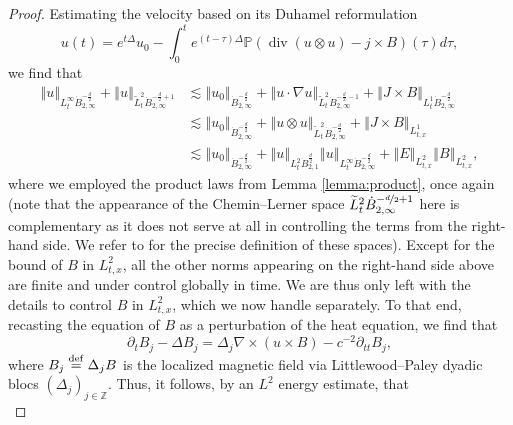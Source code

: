 \documentclass[11pt, leqno, a4paper,]{amsart}
\theoremstyle{remark}
\numberwithin{equation}{section}
\newcommand*{\bydef}{\overset{\rm def}{=}}
\newcommand*{\norm}[1]{\left\Vert #1\right\Vert}
\renewcommand*{\div}{\operatorname{div}}
\begin{document}
\begin{proof} 
Estimating the velocity based on its  Duhamel reformulation 
 \begin{equation*} 
	u(t) = e^{t\Delta}u_0 - \int _0^t e^{(t-\tau)\Delta} \mathbb {P} \left ( \div (u\otimes u) -j \times B\right)(\tau) d\tau,
\end{equation*}	
we find that 
\begin{equation}\label{negative:es:u}
	\begin{aligned}
		\norm {u}_{L^\infty_t \dot  B^{-\frac{d}{2}}_{2,\infty}} +\norm{u}_{\widetilde L^2_t \dot B^{-\frac{d}{2}+ 1}_{2,\infty}} 
		&\lesssim \norm {u_0}_{  \dot B^{-\frac{d}{2} }_{2,\infty}} + \norm {u\cdot \nabla u}_{\widetilde L^2_t \dot B^{-\frac{d}{2}-1}_{2,\infty}}  +  \norm {J\times B}_{L^1_t  \dot B^{-\frac{d}{2}}_{2,\infty}}
		\\&\lesssim \norm {u_0}_{  \dot B^{-\frac{d}{2} }_{2,\infty}} + \norm {u\otimes u}_{\widetilde L^2_t \dot B^{-\frac{d}{2}}_{2,\infty}}  + \norm {J\times B}_{L^1_{t,x}} 
		\\&\lesssim \norm {u_0}_{  \dot B^{-\frac{d}{2} }_{2,\infty}} + \norm {u }_{ L^2_t \dot B^{\frac{d}{2}}_{2,1}}\norm {u }_{  L^\infty _t \dot B^{-\frac{d}{2}}_{2,\infty}}  + \norm E
_{L^2_{t,x}} \norm B 
_{L^2_{t,x}} ,
	\end{aligned} 
\end{equation}
where we employed the product laws from Lemma \ref{lemma:product}, once again (note that the appearance of the  Chemin--Lerner space $ \widetilde L^2_t \dot B^{-\nicefrac{d}{2}+ 1}_{2,\infty} $ here is complementary as it does not serve at all in controlling the terms from the right-hand side. We refer to \cite{bcd11} for the precise definition of these spaces).    
Except for the bound  of  $ B $ in $
{L^2_{t,x}} $,   all the other norms appearing on the right-hand side above are finite and under control globally in time. We are thus only left with  the details  to control  $ B $ in $
{L^2_{t,x}} $, which we now handle separately.  To that end, recasting the equation of $B$ as a perturbation of the heat equation, we find that 
 \begin{equation*}
 	  \partial_t B _j- \Delta B_j  = \Delta_j \nabla \times (u\times B) - c^{-2}\partial_{tt} B_j ,
 \end{equation*}
 where  $B_j\bydef \Delta_j B$ is the localized magnetic field via Littlewood--Paley dyadic blocs $(\Delta_j)_{j\in \mathbb Z}$. Thus, it follows, by an $L^2$ energy estimate, that 
 \begin{equation}\label{parabolic_inequality}

\end{equation}
\end{proof}
\end{document}
